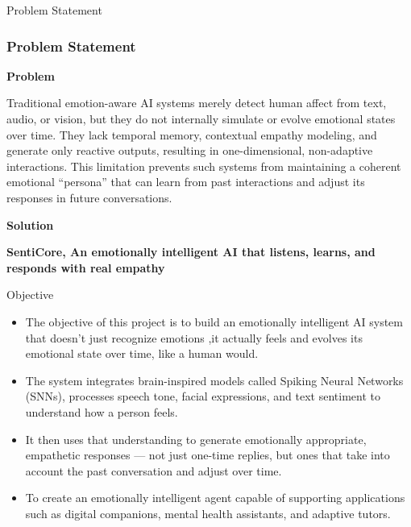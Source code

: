 \documentclass[aspectratio=169]{beamer}
\begin{document}
\begin{frame}{Problem Statement}
   \frametitle{ Problem Statement }
       \tem\textbf{Problem}
       \item Traditional emotion-aware AI systems merely detect human affect from text, audio, or vision,
       but they do not internally simulate or evolve emotional states over time. They lack temporal memory, contextual empathy modeling, and generate only reactive outputs, resulting in one-dimensional, non-adaptive interactions. This limitation prevents such systems from maintaining a coherent emotional “persona” that can learn from past interactions and adjust its responses in future conversations.
       \item\textbf{Solution}
       \item \textbf{SentiCore, An emotionally intelligent AI that listens, learns, and responds with real empathy} 
\end{frame}
        


\begin{frame}{Objective}
    \begin{itemize}
        \item The objective of this project is to build an emotionally intelligent AI system that doesn't just recognize emotions ,it actually feels and evolves its emotional state over time, like a human would.
        \item The system integrates  brain-inspired models called Spiking Neural Networks (SNNs),  processes speech tone, facial expressions, and text sentiment to understand how a person feels.
        \item It then uses that understanding to generate emotionally appropriate, empathetic responses — not just one-time replies, but ones that take into account the past conversation and adjust over time.
        
        \item To create an emotionally intelligent agent capable of supporting applications such as digital companions, mental health assistants, and adaptive tutors.
    \end{itemize}
\end{frame}
\end{document}
